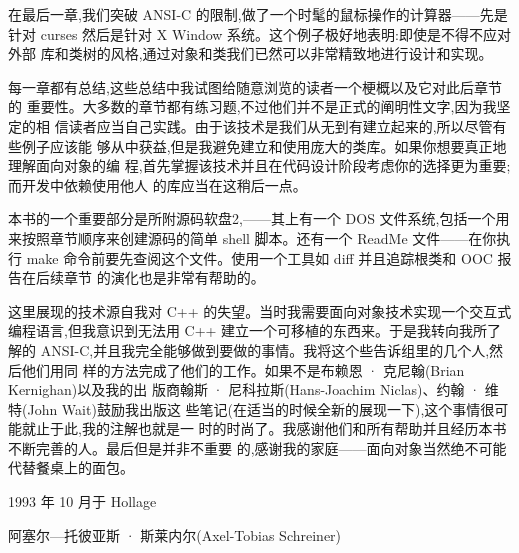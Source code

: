 在最后一章,我们突破 ANSI-C 的限制,做了一个时髦的鼠标操作的计算器——先是 针对 curses 然后是针对 X Window 系统。这个例子极好地表明:即使是不得不应对外部 库和类树的风格,通过对象和类我们已然可以非常精致地进行设计和实现。

每一章都有总结,这些总结中我试图给随意浏览的读者一个梗概以及它对此后章节的 重要性。大多数的章节都有练习题,不过他们并不是正式的阐明性文字,因为我坚定的相 信读者应当自己实践。由于该技术是我们从无到有建立起来的,所以尽管有些例子应该能 够从中获益,但是我避免建立和使用庞大的类库。如果你想要真正地理解面向对象的编 程,首先掌握该技术并且在代码设计阶段考虑你的选择更为重要;而开发中依赖使用他人 的库应当在这稍后一点。

本书的一个重要部分是所附源码软盘2,——其上有一个 DOS 文件系统,包括一个用 来按照章节顺序来创建源码的简单 shell 脚本。还有一个 ReadMe 文件——在你执行 make 命令前要先查阅这个文件。使用一个工具如 diff 并且追踪根类和 OOC 报告在后续章节 的演化也是非常有帮助的。

这里展现的技术源自我对 C++ 的失望。当时我需要面向对象技术实现一个交互式 编程语言,但我意识到无法用 C++ 建立一个可移植的东西来。于是我转向我所了解的 ANSI-C,并且我完全能够做到要做的事情。我将这个些告诉组里的几个人,然后他们用同 样的方法完成了他们的工作。如果不是布赖恩 · 克尼翰(Brian Kernighan)以及我的出 版商翰斯 · 尼科拉斯(Hans-Joachim Niclas)、约翰 · 维特(John Wait)鼓励我出版这 些笔记(在适当的时候全新的展现一下),这个事情很可能就止于此,我的注解也就是一 时的时尚了。我感谢他们和所有帮助并且经历本书不断完善的人。最后但是并非不重要 的,感谢我的家庭——面向对象当然绝不可能代替餐桌上的面包。

1993 年 10 月于 Hollage

阿塞尔—托彼亚斯 · 斯莱内尔(Axel-Tobias Schreiner)